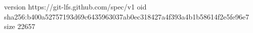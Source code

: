 version https://git-lfs.github.com/spec/v1
oid sha256:b400a52757193d69c6435963037ab0ec318427a4f393a4b1b58614f2e5fe96e7
size 22657
